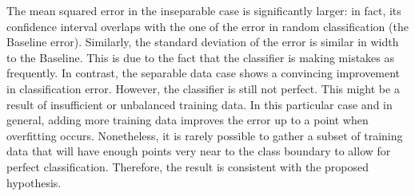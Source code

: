 \documentclass[12pt,notitlepage,twoside]{scrreprt}
\begin{document}
The mean squared error in the inseparable case is significantly larger: in fact, its
confidence interval overlaps with the one of the error in random classification (the
Baseline error). Similarly, the standard deviation of the error is similar in width to the
Baseline. This is due to the fact that the classifier is making mistakes as frequently. In
contrast, the separable data case shows a convincing improvement in classification error.
However, the classifier is still not perfect. This might be a result of insufficient
or unbalanced training data. In this particular case and in general, adding more training
data improves the error up to a point when overfitting occurs. Nonetheless, it is rarely
possible to gather a subset of training data that will have enough points very near to the class
boundary to allow for perfect classification. Therefore, the result is consistent with the
proposed hypothesis.
\end{document}
